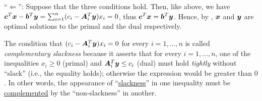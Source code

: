 \begin{enumerate}
\begin{pf}
``\(\Leftarrow\)'': Suppose that the three conditions hold. Then, like above,
we have
\(\bm{c}^{T}\bm{x}-\bm{b}^{T}\bm{y}=\sum_{i=1}^{n}(c_i-\bm{A}_i^{T}\bm{y})x_i
=0\), thus \(\bm{c}^{T}\bm{x}=\bm{b}^{T}\bm{y}\). Hence, by
, \(\bm{x}\) and \(\bm{y}\) are optimal
solutions to the primal and the dual respectively.
\end{pf}

\begin{note}
The condition that \((c_i-\bm{A}_i^{T}\bm{y})x_i=0\) for every
\(i=1,\dotsc,n\) is called \emph{complementary slackness} because it asserts
that for every \(i=1,\dotsc,n\), one of the inequalities \(x_i\ge 0\) (primal)
and \(\bm{A}_i^{T}\bm{y}\le c_i\) (dual) must hold \emph{tightly} without
``slack'' (i.e., the equality holds); otherwise the expression would be greater
than \(0\). In other words, the appearance of ``\underline{slackness}'' in one
inequality must be \underline{complemented} by the ``non-slackness'' in
another.
\end{note}
\end{enumerate}
